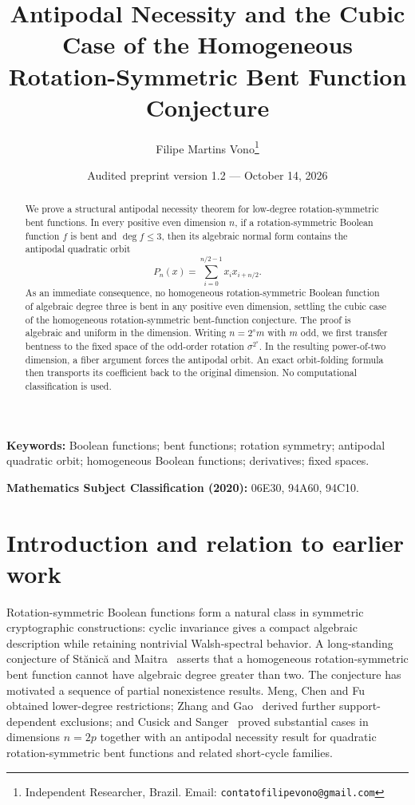 \documentclass[11pt,a4paper]{article}
\title{Antipodal Necessity and the Cubic Case of the Homogeneous Rotation-Symmetric Bent Function Conjecture}
\author{Filipe Martins Vono\thanks{Independent Researcher, Brazil. Email: \texttt{contatofilipevono@gmail.com}}}
\date{Audited preprint version 1.2 --- October 14, 2026}
\theoremstyle{remark}
\theoremstyle{plain}
\begin{document}
\maketitle
\begin{abstract}
We prove a structural antipodal necessity theorem for low-degree rotation-symmetric bent functions. In every positive even dimension $n$, if a rotation-symmetric Boolean function $f$ is bent and $\deg f\le3$, then its algebraic normal form contains the antipodal quadratic orbit
\[
P_n(x)=\sum_{i=0}^{n/2-1}x_i x_{i+n/2}.
\]
As an immediate consequence, no homogeneous rotation-symmetric Boolean function of algebraic degree three is bent in any positive even dimension, settling the cubic case of the homogeneous rotation-symmetric bent-function conjecture. The proof is algebraic and uniform in the dimension. Writing $n=2^s m$ with $m$ odd, we first transfer bentness to the fixed space of the odd-order rotation $\sigma^{2^s}$. In the resulting power-of-two dimension, a fiber argument forces the antipodal orbit. An exact orbit-folding formula then transports its coefficient back to the original dimension. No computational classification is used.
\end{abstract}
\noindent\textbf{Keywords:} Boolean functions; bent functions; rotation symmetry; antipodal quadratic orbit; homogeneous Boolean functions; derivatives; fixed spaces.

\noindent\textbf{Mathematics Subject Classification (2020):} 06E30, 94A60, 94C10.

\section{Introduction and relation to earlier work}
Rotation-symmetric Boolean functions form a natural class in symmetric cryptographic constructions: cyclic invariance gives a compact algebraic description while retaining nontrivial Walsh-spectral behavior. A long-standing conjecture of St\u{a}nic\u{a} and Maitra~\cite{stanica} asserts that a homogeneous rotation-symmetric bent function cannot have algebraic degree greater than two. The conjecture has motivated a sequence of partial nonexistence results. Meng, Chen and Fu~\cite{meng} obtained lower-degree restrictions; Zhang and Gao~\cite{zhang} derived further support-dependent exclusions; and Cusick and Sanger~\cite{cusick} proved substantial cases in dimensions $n=2p$ together with an antipodal necessity result for quadratic rotation-symmetric bent functions and related short-cycle families.
\end{document}
